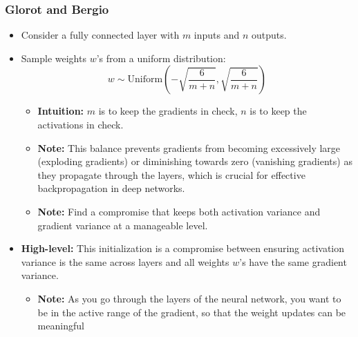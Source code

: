 \subsubsection{Glorot and Bergio}
\begin{summary}
    \begin{itemize}
        \item Consider a fully connected layer with \( m \) inputs and \( n \) outputs.
        
        \item Sample weights \( w \)'s from a uniform distribution:
        \[
        w \sim \text{Uniform}\left(-\sqrt{\frac{6}{m+n}}, \sqrt{\frac{6}{m+n}}\right)
        \]
        \begin{itemize}
            \item \textbf{Intuition:} $m$ is to keep the gradients in check, $n$ is to keep the activations in check. 
            \item \textbf{Note:} This balance prevents gradients from becoming excessively large (exploding gradients) or diminishing towards zero (vanishing gradients) as they propagate through the layers, which is crucial for effective backpropagation in deep networks.
            \item \textbf{Note:} Find a compromise that keeps both activation variance and gradient variance at a manageable level.
        \end{itemize}
    
        \item \textbf{High-level:} This initialization is a compromise between ensuring activation variance is the same across layers and all weights \( w \)'s have the same gradient variance.
        \begin{itemize}
            \item \textbf{Note:} As you go through the layers of the neural network, you want to be in the active range of the gradient, so that the weight updates can be meaningful
        \end{itemize}
    \end{itemize}
\end{summary}